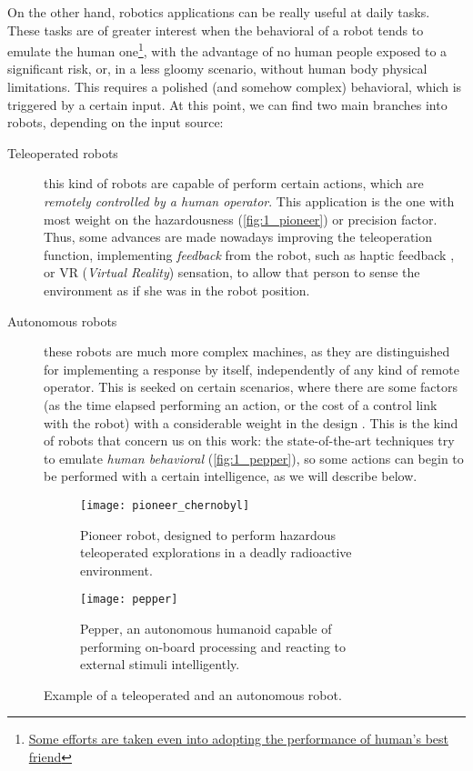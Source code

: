 On the other hand, robotics applications can be really useful at daily tasks. These tasks are of greater interest when the behavioral of a robot tends to emulate the human one\footnote{\href{https://www.engadget.com/2018/01/08/new-sony-aibo-first-impressions/}{Some efforts are taken even into adopting the performance of human's best friend}}, with the advantage of no human people exposed to a significant risk, or, in a less gloomy scenario, without human body physical limitations. This requires a polished (and somehow complex) behavioral, which is triggered by a certain input. At this point, we can find two main branches into robots, depending on the input source:
\begin{description}
	\item [Teleoperated robots] this kind of robots are capable of perform certain actions, which are \textit{remotely controlled by a human operator}. This application is the one with most weight on the hazardousness (\autoref{fig:1_pioneer}) \cite{chernobyl-robot} or precision \cite{teleop-surgery} factor. Thus, some advances are made nowadays improving the teleoperation function, implementing \textit{feedback} from the robot, such as haptic feedback \cite{teleop-haptic}, or VR (\emph{Virtual Reality}) sensation, to allow that person to sense the environment as if she was in the robot position.
	
	\item [Autonomous robots] these robots are much more complex machines, as they are distinguished for implementing a response by itself, independently of any kind of remote operator. This is seeked on certain scenarios, where there are some factors (as the time elapsed performing an action, or the cost of a control link with the robot) with a considerable weight in the design \cite{ai-space}. This is the kind of robots that concern us on this work: the state-of-the-art techniques try to emulate \textit{human behavioral} (\autoref{fig:1_pepper}), so some actions can begin to be performed with a certain intelligence, as we will describe below.
\end{description}


\begin{figure}[h]
	\centering
	\begin{subfigure}[t]{0.45\textwidth}
		\centering
		\texttt{[image: pioneer\_chernobyl]}
		\caption{Pioneer robot, designed to perform hazardous teleoperated explorations in a deadly radioactive environment.}
		\label{fig:1_pioneer}
	\end{subfigure}
	\hfill
	\begin{subfigure}[t]{0.4\textwidth}
		\centering
		\texttt{[image: pepper]}
		\caption{Pepper, an autonomous humanoid capable of performing on-board processing and reacting to external stimuli intelligently.}
		\label{fig:1_pepper}
	\end{subfigure}
	\caption{Example of a teleoperated and an autonomous robot.}
	\label{fig:1_robots}
\end{figure}

